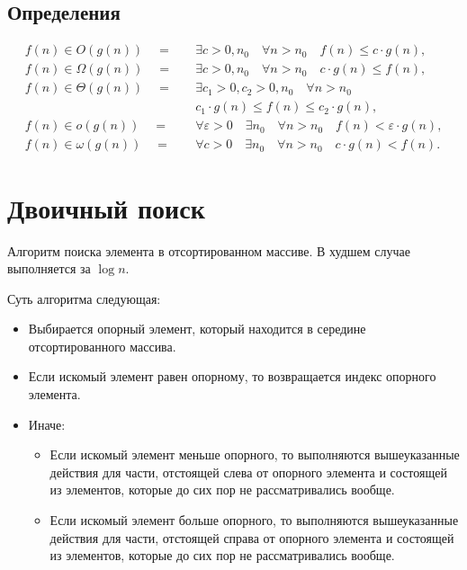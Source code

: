 \subsection{Определения}
\begin{align}
  f(n) \in O(g(n)) \quad = \quad &\exists c > 0, n_0 \quad \forall n > n_0 \quad f(n) \leq c \cdot g(n),\\
  f(n) \in \Omega(g(n)) \quad = \quad &\exists c > 0, n_0 \quad \forall n > n_0 \quad c \cdot g(n) \leq f(n),\\
  f(n) \in \Theta(g(n)) \quad = \quad &\exists c_1 > 0, c_2 > 0, n_0 \quad \forall n > n_0 \nonumber\\
                                      &c_1 \cdot g(n) \leq f(n) \leq c_2 \cdot g(n),\\
  f(n) \in o(g(n)) \quad = \quad &\forall \varepsilon > 0 \quad \exists n_0 \quad \forall n > n_0 \quad f(n) < \varepsilon \cdot g(n),\\
  f(n) \in \omega(g(n)) \quad = \quad &\forall c > 0 \quad \exists n_0 \quad \forall n > n_0 \quad c \cdot g(n) < f(n).
\end{align}

\section{Двоичный поиск}
\label{sec:binary-search}

Алгоритм поиска элемента в отсортированном массиве. В худшем случае выполняется за $\log{n}$.

Суть алгоритма следующая:

\begin{itemize}
  \item Выбирается опорный элемент, который находится в середине отсортированного массива.
  \item Если искомый элемент равен опорному, то возвращается индекс опорного элемента.
  \item Иначе:
    \begin{itemize}
      \item Если искомый элемент меньше опорного, то выполняются вышеуказанные действия для части, отстоящей слева от опорного элемента и состоящей из элементов, которые до сих пор не рассматривались вообще.
      \item Если искомый элемент больше опорного, то выполняются вышеуказанные действия для части, отстоящей справа от опорного элемента и состоящей из элементов, которые до сих пор не рассматривались вообще.
    \end{itemize}
\end{itemize}

